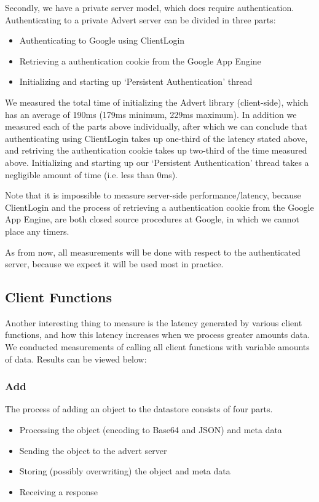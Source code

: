 Secondly, we have a private server model, which does require authentication.
Authenticating to a private Advert server can be divided in three parts:

\begin{itemize}
  \item Authenticating to Google using ClientLogin
  \item Retrieving a authentication cookie from the Google App Engine
  \item Initializing and starting up `Persistent Authentication' thread
\end{itemize}

We measured the total time of initializing the Advert library (client-side),
which has an average of 190ms (179ms minimum, 229ms maximum). In addition we
measured each of the parts above individually, after which we can conclude that
authenticating using ClientLogin takes up one-third of the latency stated above,
and retriving the authentication cookie takes up two-third of the time measured
above. Initializing and starting up our `Persistent Authentication' thread
takes a negligible amount of time (i.e. less than 0ms).

Note that it is impossible to measure server-side performance/latency, because
ClientLogin and the process of retrieving a authentication cookie from the
Google App Engine, are both closed source procedures at Google, in which we
cannot place any timers.

As from now, all measurements will be done with respect to the authenticated
server, because we expect it will be used most in practice.

\subsection{Client Functions}
Another interesting thing to measure is the latency generated by various client
functions, and how this latency increases when we process greater amounts data.
We conducted measurements of calling all client functions with variable amounts
of data. Results can be viewed below:

\subsubsection{Add}
The process of adding an object to the datastore consists of four parts.

\begin{itemize}
  \item Processing the object (encoding to Base64 and JSON) and meta data
  \item Sending the object to the advert server
  \item Storing (possibly overwriting) the object and meta data
  \item Receiving a response
\end{itemize}

